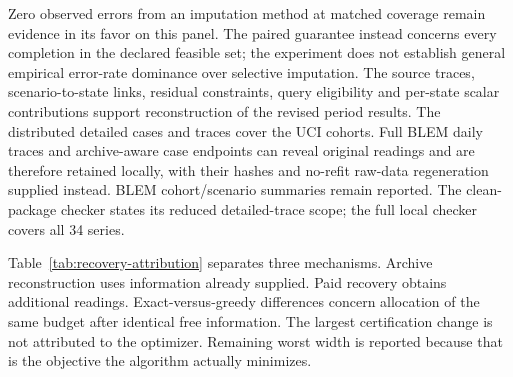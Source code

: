 \documentclass[12pt]{article}
\begin{document}
Zero observed errors from an imputation method at matched coverage remain
evidence in its favor on this panel. The paired guarantee instead concerns
every completion in the declared feasible set; the experiment does not
establish general empirical error-rate dominance over selective imputation.
The source traces, scenario-to-state links, residual constraints, query
eligibility and per-state scalar contributions support reconstruction of
the revised period results. The distributed detailed cases and traces
cover the UCI cohorts. Full BLEM daily traces and archive-aware case
endpoints can reveal original readings and are therefore retained locally,
with their hashes and no-refit raw-data regeneration supplied instead.
BLEM cohort/scenario summaries remain reported. The clean-package checker
states its reduced detailed-trace scope; the full local checker covers
all 34 series.

Table~\ref{tab:recovery-attribution} separates three mechanisms. Archive
reconstruction uses information already supplied. Paid recovery obtains
additional readings. Exact-versus-greedy differences concern allocation of
the same budget after identical free information. The largest certification
change is not attributed to the optimizer. Remaining worst width is
reported because that is the objective the algorithm actually minimizes.


\FloatBarrier
\end{document}
